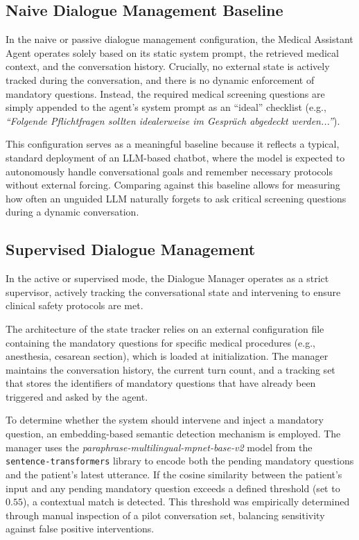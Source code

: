\subsection{Naive Dialogue Management Baseline}

In the naive or passive dialogue management configuration, the Medical Assistant Agent operates solely based on its static system prompt, the retrieved medical context, and the conversation history. 
Crucially, no external state is actively tracked during the conversation, and there is no dynamic enforcement of mandatory questions. 
Instead, the required medical screening questions are simply appended to the agent's system prompt as an ``ideal'' checklist (e.g., \textit{``Folgende Pflichtfragen sollten idealerweise im Gespräch abgedeckt werden...''}).

This configuration serves as a meaningful baseline because it reflects a typical, standard deployment of an LLM-based chatbot, where the model is expected to autonomously handle conversational goals and remember necessary protocols without external forcing. Comparing against this baseline allows for measuring how often an unguided LLM naturally forgets to ask critical screening questions during a dynamic conversation.

\subsection{Supervised Dialogue Management}

In the active or supervised mode, the Dialogue Manager operates as a strict supervisor, actively tracking the conversational state and intervening to ensure clinical safety protocols are met.

The architecture of the state tracker relies on an external configuration file containing the mandatory questions for specific medical procedures (e.g., anesthesia, cesarean section), which is loaded at initialization. 
The manager maintains the conversation history, the current turn count, and a tracking set that stores the identifiers of mandatory questions that have already been triggered and asked by the agent.

To determine whether the system should intervene and inject a mandatory question, an embedding-based semantic detection mechanism is employed. 
The manager uses the \textit{paraphrase-multilingual-mpnet-base-v2} model from the \texttt{sentence-transformers} library to encode both the pending mandatory questions and the patient's latest utterance. 
If the cosine similarity between the patient's input and any pending mandatory question exceeds a defined threshold (set to $0.55$), a contextual match is detected.
This threshold was empirically determined through manual inspection of a pilot conversation set, balancing sensitivity against false positive interventions.

